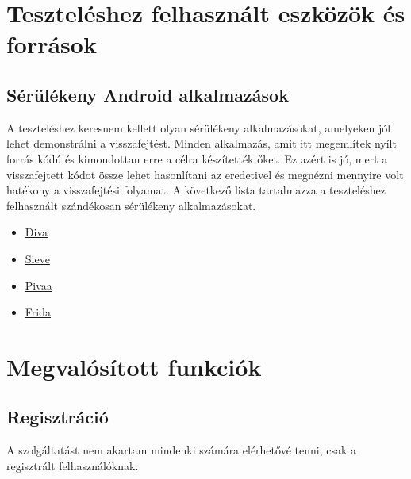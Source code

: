 \documentclass{thesis-ekf}
\theoremstyle{definition}
\theoremstyle{remark}
\begin{document}

\chapter{Teszteléshez felhasznált eszközök és források}\label{teszteles}

\section{Sérülékeny Android alkalmazások}

A teszteléshez keresnem kellett olyan sérülékeny alkalmazásokat, amelyeken jól lehet demonstrálni a visszafejtést.
Minden alkalmazás, amit itt megemlítek nyílt forrás kódú és kimondottan erre a célra készítették őket.
Ez azért is jó, mert a visszafejtett kódot össze lehet hasonlítani az eredetivel és megnézni mennyire volt hatékony a visszafejtési folyamat.
A következő lista tartalmazza a teszteléshez felhasznált szándékosan sérülékeny alkalmazásokat.

\begin{itemize}
	\item \href{https://github.com/payatu/diva-android}{Diva}
	\item \href{https://github.com/as0ler/Android-Examples}{Sieve}
	\item \href{https://github.com/htbridge/pivaa}{Pivaa}
	\item \href{https://github.com/t0thkr1s/frida-demo}{Frida}
\end{itemize}

\chapter{Megvalósított funkciók}\label{funkciok}

\section{Regisztráció}

A szolgáltatást nem akartam mindenki számára elérhetővé tenni, csak a regisztrált felhasználóknak.
\end{document}
